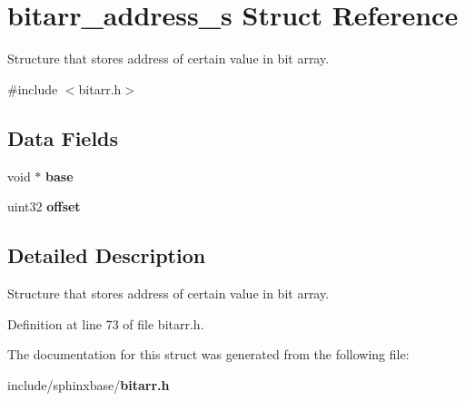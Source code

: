 \section{bitarr\-\_\-address\-\_\-s Struct Reference}
\label{structbitarr__address__s}


Structure that stores address of certain value in bit array.  




{\ttfamily \#include $<$bitarr.\-h$>$}

\subsection*{Data Fields}
\begin{DoxyCompactItemize}
\item 
void $\ast$ {\bfseries base}\label{structbitarr__address__s_a2ac6eb57a1f8feea9d3ab947af61cd26}

\item 
uint32 {\bfseries offset}\label{structbitarr__address__s_a25e454a04427113d373f6200a6c87de2}

\end{DoxyCompactItemize}


\subsection{Detailed Description}
Structure that stores address of certain value in bit array. 

Definition at line 73 of file bitarr.\-h.



The documentation for this struct was generated from the following file\-:\begin{DoxyCompactItemize}
\item 
include/sphinxbase/{\bf bitarr.\-h}\end{DoxyCompactItemize}
